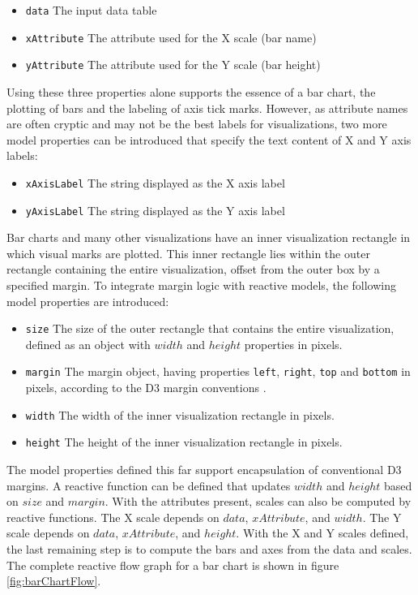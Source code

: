 \begin{itemize}
\item \verb`data` The input data table
\item \verb`xAttribute` The attribute used for the X scale (bar name)
\item \verb`yAttribute` The attribute used for the Y scale (bar height)
\end{itemize}

Using these three properties alone supports the essence of a bar chart, the plotting of bars and the labeling of axis tick marks. However, as attribute names are often cryptic and may not be the best labels for visualizations, two more model properties can be introduced that specify the text content of X and Y axis labels:

\begin{itemize}
\item \verb`xAxisLabel` The string displayed as the X axis label
\item \verb`yAxisLabel` The string displayed as the Y axis label
\end{itemize}

Bar charts and many other visualizations have an inner visualization rectangle in which visual marks are plotted. This inner rectangle lies within the outer rectangle containing the entire visualization, offset from the outer box by a specified margin. To integrate margin logic with reactive models, the following model properties are introduced:

\begin{itemize}
\item \verb`size` The size of the outer rectangle that contains the entire visualization, defined as an object with $width$ and $height$ properties in pixels.
\item \verb`margin` The margin object, having properties \verb`left`, \verb`right`, \verb`top` and \verb`bottom` in pixels, according to the D3 margin conventions \cite{d3conventionalmargins}.
\item \verb`width` The width of the inner visualization rectangle in pixels.
\item \verb`height` The height of the inner visualization rectangle in pixels.
\end{itemize}

The model properties defined this far support encapsulation of conventional D3 margins. A reactive function can be defined that updates $width$ and $height$ based on $size$ and $margin$. With the attributes present, scales can also be computed by reactive functions. The X scale depends on $data$, $xAttribute$, and $width$. The Y scale depends on $data$, $xAttribute$, and $height$. With the X and Y scales defined, the last remaining step is to compute the bars and axes from the data and scales. The complete reactive flow graph for a bar chart is shown in figure \ref{fig:barChartFlow}.

